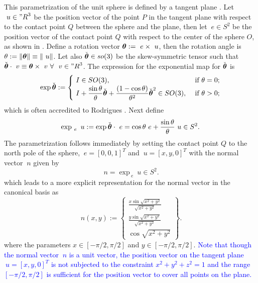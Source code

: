 \documentclass[12pt]{article}
\numberwithin{equation}{section}
\begin{document}
This parametrization of the unit sphere is defined by a tangent plane
\citep{Simo.Fox:1989}. Let $~u\in {"R}^3$ be the position vector of
the point $P$ in the tangent plane with respect to the contact point
$Q$ between the sphere and the plane, then let $~e \in S^2$ be the
position vector of the contact point $Q$ with respect to the center of
the sphere $O$, as shown in . Define a rotation
vector ${\boldsymbol{\theta}} := ~e \times ~u$, then the rotation angle is $\theta
:= \| {\boldsymbol{\theta}} \| \equiv \| ~u \|$. Let also $\check{{\boldsymbol{\theta}}} \in
so(3)$ be the skew-symmetric tensor such that $\check{{\boldsymbol{\theta}}} \cdot
~v \equiv {\boldsymbol{\theta}} \times ~v \ \forall \ ~v \in {"R}^3$. The expression
for the exponential map for $\check{{\boldsymbol{\theta}}}$ is
\begin{equation}
  \exp \check{{\boldsymbol{\theta}}}
  :=
  \begin{cases}
    ~I \in SO(3),
    &
    \text{ if }\theta = 0;
    \\
    \displaystyle{
      ~I + \frac{\sin \theta}{\theta} \check{{\boldsymbol{\theta}}} +
      \frac{(1 - \cos \theta)}{\theta^2} \check{{\boldsymbol{\theta}}}^2 \in SO(3),
    }
    &
    \text{ if }\theta > 0;
  \end{cases}
  \label{eq:Rodrigues-formula}
\end{equation}
which is often accredited to Rodrigues \citep{Gallier:2011}. Next
define
\begin{equation}
  \exp_{~e} ~u
  :=
  \exp \check{{\boldsymbol{\theta}}} \cdot ~e
  =
  \cos \theta ~e + \frac{\sin \theta}{\theta}
  ~u \in S^2.
\end{equation}
The parametrization follows immediately by setting the contact point
$Q$ to the north pole of the sphere, \ie $~e = [0,0,1]^T$ and $~u =
[x,y,0]^T$ with the normal vector $~n$ given by
\begin{equation}
  ~n
  =
  \exp_{~e} ~u \in S^2.
\end{equation}
which leads to a more explicit representation for the normal vector in
the canonical basis as
\begin{equation}
  ~n(x,y)
  :=
  \begin{Bmatrix}
    \frac{\displaystyle x \sin \sqrt{x^2+y^2}}{\displaystyle \sqrt{x^2+y^2}}
    \\[0.9em]
    \frac{\displaystyle y \sin \sqrt{x^2+y^2}}{\displaystyle \sqrt{x^2+y^2}}
    \\[0.9em]
    \cos \sqrt{x^2+y^2}
  \end{Bmatrix}.
\end{equation}
where the parameters $x \in [-\pi / 2, \pi / 2]$ and
$y \in [-\pi / 2, \pi / 2]$. \textcolor{blue}{Note that though the
normal vector $~n$ is a unit vector, the position vector on the tangent 
plane $~u =[x,y,0]^T$ is not subjected to the constraint 
$x^2+y^2+z^2 = 1$ and the range $[-\pi / 2, \pi / 2]$ is sufficient for 
the position vector to cover all points on the plane.}
\end{document}

